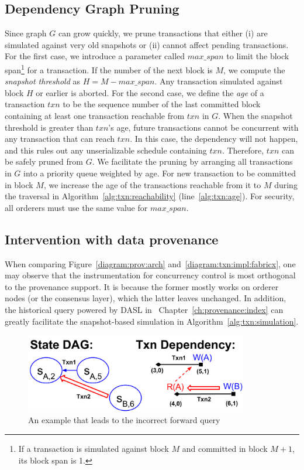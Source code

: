 \subsection{Dependency Graph Pruning}
\label{ch:txn:impl:optimization}
Since graph $G$ can grow quickly, we prune transactions that either (i) are simulated against very old snapshots or (ii) cannot affect pending transactions.
%
For the first case, we introduce a parameter called $max\_span$ to limit the block span\footnote{If a transaction is simulated against block $M$ and committed in block $M+1$, its block span is 1.} for
a transaction.
%
If the number of the next block is $M$, we compute the \textit{snapshot
  threshold} as $H = M - max\_span$.
%
Any transaction simulated against block $H$ or earlier is aborted.
%
For the second case, we define the \textit{age} of a transaction $txn$ to be the sequence
number of the last committed block containing at least one transaction reachable
from $txn$ in $G$.
%
When the snapshot threshold is greater than $txn$'s age, future transactions
cannot be concurrent with any transaction that can reach $txn$.
%
In this case, the  dependency will not happen, and this rules
out any unserializable schedule containing $txn$.
%
Therefore, $txn$ can be safely pruned from $G$.
%
We facilitate the pruning by arranging all transactions in $G$ into a priority
queue weighted by age.
%
For new transaction to be committed in block $M$, we increase the age of the
transactions reachable from it to $M$ during the traversal in
Algorithm~\ref{alg:txn:reachability} (line~\ref{alg:txn:age}).
%
For security, all orderers must use the same value for $max\_span$.

\subsection{Intervention with data provenance}
\label{ch:txn:impl:intervention}
When comparing Figure~\ref{diagram:prov:arch} and~\ref{diagram:txn:impl:fabricx}, one may observe that the instrumentation for concurrency control is most orthogonal to the provenance support. 
It is because the former mostly works on orderer nodes (or the consensus layer), which the latter leaves unchanged. 
In addition, the historical query powered by DASL in ~Chapter~\ref{ch:provenance:index} can greatly facilitate the snapshot-based simulation in Algorithm~\ref{alg:txn:simulation}. 

\begin{figure}
  \centering
	\includegraphics[width=0.87\textwidth]{diagram/txn/odd.pdf}
  \caption{An example that leads to the incorrect forward query}
	\label{diagram:txn:impl:sharp}
\end{figure}

